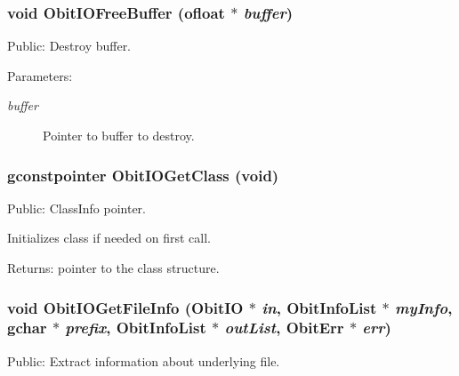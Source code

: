 \subsubsection{\setlength{\rightskip}{0pt plus 5cm}void Obit\-IOFree\-Buffer ({\bf ofloat} $\ast$ {\em buffer})}\label{ObitIO_8h_a52}


Public: Destroy buffer. 

\begin{Desc}
\item[Parameters:]
\begin{description}
\item[{\em buffer}]Pointer to buffer to destroy. \end{description}
\end{Desc}
\subsubsection{\setlength{\rightskip}{0pt plus 5cm}gconstpointer Obit\-IOGet\-Class (void)}\label{ObitIO_8h_a30}


Public: Class\-Info pointer. 

Initializes class if needed on first call. \begin{Desc}
\item[Returns:]pointer to the class structure. \end{Desc}
\subsubsection{\setlength{\rightskip}{0pt plus 5cm}void Obit\-IOGet\-File\-Info ({\bf Obit\-IO} $\ast$ {\em in}, {\bf Obit\-Info\-List} $\ast$ {\em my\-Info}, gchar $\ast$ {\em prefix}, {\bf Obit\-Info\-List} $\ast$ {\em out\-List}, {\bf Obit\-Err} $\ast$ {\em err})}\label{ObitIO_8h_a55}


Public: Extract information about underlying file. 

